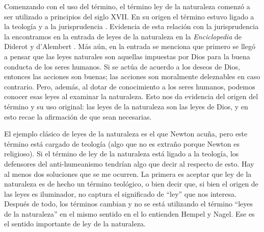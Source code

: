 Comenzando con el uso del término, el término ley de la naturaleza comenzó a ser utilizado a principios del siglo XVII. En su origen el término estuvo ligado a la teología y a la jurisprudencia \cite{Giere2006, Giere1999}. Evidencia de esta relación con la jurisprudencia la encontramos en la entrada de leyes de la naturaleza en la \textit{Enciclopedia} de Diderot y d'Alembert \cite{lawna}. Más aún, en la entrada se menciona que primero se llegó a pensar que las leyes naturales son aquellas impuestas por Dios para la buena conducta de los seres humanos. Si se actúa de acuerdo a los deseos de Dios, entonces las acciones son buenas; las acciones son moralmente deleznables en caso contrario. Pero, además, al dotar de conocimiento a los seres humanos,%
podemos conocer esas leyes al examinar la naturaleza. Esto nos da evidencia del origen del término y su uso original: las leyes de  la naturaleza son las leyes de Dios, y en esto recae la afirmación de que sean necesarias.

El ejemplo clásico de leyes de la naturaleza es el que Newton acuña, pero este término está cargado de teología%
(algo que no es extraño porque Newton es religioso).%
Si el término de ley de la naturaleza está ligado a la teología, los defensores del anti-humeanismo tendrían algo que decir al respecto de esto. Hay al menos dos soluciones que se me ocurren. La primera es aceptar que ley de la naturaleza es de hecho un término teológico, o bien decir que, si bien el origen de las leyes es iluminador, no captura el significado de ``ley'' que nos interesa. Después de todo, los términos cambian y no se está utilizando el término ``leyes de la naturaleza'' en el mismo sentido en el lo entienden Hempel y Nagel. Ese es el sentido importante de ley de la naturaleza.%

